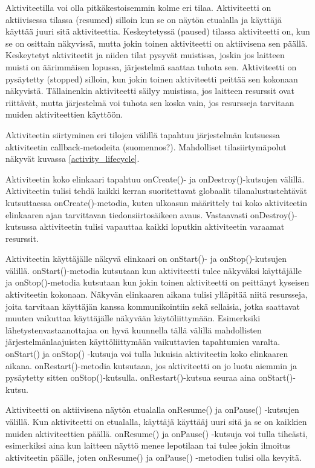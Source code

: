 Aktiviteetilla voi olla pitkäkestoisemmin kolme eri tilaa. Aktiviteetti on aktiivisessa tilassa (resumed) silloin kun se on näytön etualalla ja käyttäjä käyttää juuri sitä aktiviteettia. Keskeytetyssä (paused) tilassa aktiviteetti on, kun se on osittain näkyvissä, mutta jokin toinen aktiviteetti on aktiivisena sen päällä. Keskeytetyt aktiviteetit ja niiden tilat pysyvät muistissa, joskin jos laitteen muisti on äärimmäisen lopussa, järjestelmä saattaa tuhota sen. Aktiviteetti on pysäytetty (stopped) silloin, kun jokin toinen aktiviteetti peittää sen kokonaan näkyvistä. Tällainenkin aktiviteetti säilyy muistissa, jos laitteen resurssit ovat riittävät, mutta järjestelmä voi tuhota sen koska vain, jos resursseja tarvitaan muiden aktiviteettien käyttöön.

Aktiviteetin siirtyminen eri tilojen välillä tapahtuu järjestelmän kutsuessa aktiviteetin callback-metodeita (suomennos?). Mahdolliset tilasiirtymäpolut näkyvät kuvassa \ref{activity_lifecycle}. 

Aktiviteetin koko elinkaari tapahtuu onCreate()- ja onDestroy()-kutsujen välillä. Aktiviteetin tulisi tehdä kaikki kerran suoritettavat globaalit tilanalustustehtävät kutsuttaessa onCreate()-metodia, kuten ulkoasun määrittely tai koko aktiviteetin elinkaaren ajan tarvittavan tiedonsiirtosäikeen avaus. Vastaavasti onDestroy()-kutsussa aktiviteetin tulisi vapauttaa kaikki loputkin aktiviteetin varaamat resurssit.

Aktiviteetin käyttäjälle näkyvä elinkaari on onStart()- ja onStop()-kutsujen välillä. onStart()-metodia kutsutaan kun aktiviteetti tulee näkyväksi käyttäjälle ja onStop()-metodia kutsutaan kun jokin toinen aktiviteetti on peittänyt kyseisen aktiviteetin kokonaan. Näkyvän elinkaaren aikana tulisi ylläpitää niitä resursseja, joita tarvitaan käyttäjän kanssa kommunikointiin sekä sellaisia, jotka saattavat muuten vaikuttaa käyttäjälle näkyvään käytöliittymään. Esimerksiki lähetystenvastaanottajaa on hyvä kuunnella tällä välillä mahdollisten järjestelmänlaajuisten käyttöliittymään vaikuttavien tapahtumien varalta. onStart() ja onStop() -kutsuja voi tulla lukuisia aktiviteetin koko elinkaaren aikana. onRestart()-metodia kutsutaan, jos aktiviteetti on jo luotu aiemmin ja pysäytetty sitten onStop()-kutsulla. onRestart()-kutsua seuraa aina onStart()-kutsu.

Aktiviteetti on aktiivisena näytön etualalla onResume() ja onPause() -kutsujen välillä. Kun aktiviteetti on etualalla, käyttäjä käyttääj uuri sitä ja se on kaikkien muiden aktiviteettien päällä. onResume() ja onPause() -kutsuja voi tulla tiheästi, esimerkiksi aina kun laitteen näyttö menee lepotilaan tai tulee jokin ilmoitus aktiviteetin päälle, joten onResume() ja onPause() -metodien tulisi olla kevyitä.


